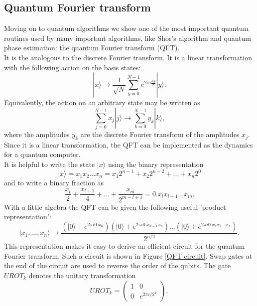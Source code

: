 \subsection{Quantum Fourier transform}
Moving on to quantum algorithms we show one of the most important quantum routines used by many important algorithms, like Shor's algorithm and quantum phase estimation: the quantum Fourier transform (QFT). \\
It is the analogous to the discrete Fourier transform. It is a linear transformation with the following action on the basis states:
\begin{equation}
    |x\rangle \rightarrow \frac1{\sqrt{N}} \sum_{y=0}^{N-1} e^{2\pi i \frac{xy}{N}} |y\rangle.
\end{equation}
Equivalently, the action on an arbitrary state may be written as
\begin{equation}
    \sum_{j=0}^{N-1} x_j |j\rangle \rightarrow \sum_{k=0}^{N-1} y_k |k\rangle,
\end{equation}
where the amplitudes $y_k$ are the discrete Fourier transform of the amplitudes $x_j$. \\
Since it is a linear transformation, the QFT can be implemented as the dynamics for a quantum computer. \\
It is helpful to write the state $|x\rangle$ using the binary representation
\begin{equation}
    |x\rangle = x_1 x_2 ... x_n = x_1 2^{n-1} + x_2 2^{n-2} + ... + x_n 2^0
\end{equation}
and to write a binary fraction as
\begin{equation}
    \frac{x_l}{2} + \frac{x_{l+1}}{4} + ... + \frac{x_m}{2^{m-l+1}} = 0.x_lx_{l+1}...x_m.
\end{equation}
With a little algebra the QFT can be given the following useful 'product representation':
\begin{equation}
    |x_1,...,x_n\rangle \rightarrow \frac{ (|0\rangle + e^{2\pi i 0.x_n}) (|0\rangle + e^{2\pi i 0.x_{n-1}x_n}) ... (|0\rangle + e^{2\pi i 0.x_1x_2...x_n}) }{2^{n/2}}.
\end{equation}
This representation makes it easy to derive an efficient circuit for the quantum Fourier transform. Such a circuit is shown in Figure \ref{QFT circuit}. Swap gates at the end of the circuit are used to reverse the order of the qubits. The gate $UROT_k$ denotes the unitary transformation
\begin{equation}
    UROT_k = \left( \begin{array}{cc} 1 & 0 \\
                                   0 & e^{2\pi i/2^k} \end{array} \right),
\end{equation}

